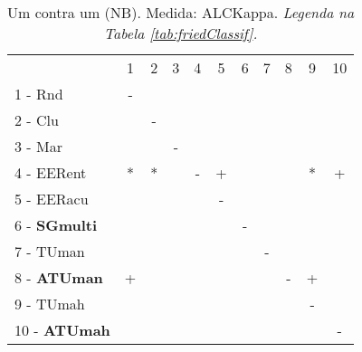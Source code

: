 \begin{table}[h]
\caption{Um contra um (NB). Medida: ALCKappa. \textit{Legenda na Tabela \ref{tab:friedClassif}.}}
\begin{center}\begin{tabular}{lcc|cc|cc|cc|cc}
 			& 1 & 2 & 3 & 4 & 5 & 6 & 7 & 8 & 9 & 10\\
1 - Rnd  	& - &   &   &   &   &   &   &   &   &   \\
2 - Clu  	&   & - &   &   &   &   &   &   &   &   \\ \hline
3 - Mar  	&   &   & - &   &   &   &   &   &   &   \\
4 - EERent	& * & * &   & - & + &   &   &   & * & + \\ \hline
5 - EERacu	&   &   &   &   & - &   &   &   &   &   \\
6 - \textbf{SGmulti}	&   &   &   &   &   & - &   &   &   &   \\ \hline
7 - TUman	&   &   &   &   &   &   & - &   &   &   \\
8 - \textbf{ATUman}	& + &   &   &   &   &   &   & - & + &   \\ \hline
9 - TUmah	&   &   &   &   &   &   &   &   & - &   \\
10 - \textbf{ATUmah}	&   &   &   &   &   &   &   &   &   & - \\ \hline\end{tabular}
\label{stratsALCKappaFriedNBRedux}
\end{center}
\end{table}